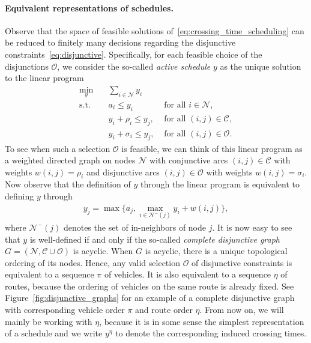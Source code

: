 \documentclass[a4paper]{article}
\theoremstyle{definition}
\theoremstyle{plain}
\begin{document}
\paragraph{Equivalent representations of schedules.}
Observe that the space of feasible solutions of~\eqref{eq:crossing_time_scheduling} can be reduced to finitely
many decisions regarding the disjunctive constraints~\eqref{eq:disjunctive}. Specifically, for each
feasible choice of the disjunctions $\mathcal{O}$, we consider the so-called
\textit{active schedule} $y$ as the unique solution to the linear program
\begin{subequations}
  \label{eq:active_schedule}
\begin{align}
  \min_{y} \quad & \sum_{i \in \mathcal{N}} y_{i} \\
  \text{s.t.} \quad & a_{i} \leq y_{i} & \text{ for all } i \in \mathcal{N}, \\
           & y_{i} + \rho_{i} \leq y_{j}, & \text{ for all } (i,j) \in \mathcal{C}, \\
           & y_{i} + \sigma_{i} \leq y_{j}, & \text{ for all } (i,j) \in \mathcal{O} .
\end{align}
\end{subequations}
To see when such a selection $\mathcal{O}$ is feasible, we can think of this
linear program as a weighted directed graph on nodes $\mathcal{N}$ with
conjunctive arcs $(i,j) \in \mathcal{C}$ with weights $w(i,j) = \rho_{i}$ and
disjunctive arcs $(i,j) \in \mathcal{O}$ with weights $w(i,j) = \sigma_{i}$. Now
observe that the definition of $y$ through the linear program is equivalent to
defining $y$ through
\begin{align}
  \label{eq:y_max}
  y_{j} = \max\{ a_{j}, \max_{i \in \mathcal{N}^{-}(j)} y_i + w(i,j) \} ,
\end{align}
where $\mathcal{N}^{-}(j)$ denotes the set of in-neighbors of node $j$. It is
now easy to see that $y$ is well-defined if and only if the so-called \textit{complete disjunctive graph}
$G=(\mathcal{N}, \mathcal{C} \cup \mathcal{O})$ is acyclic.
%
When $G$ is acyclic, there is a unique topological ordering of its nodes. Hence,
any valid selection $\mathcal{O}$ of disjunctive constraints is equivalent to a
sequence $\pi$ of vehicles. It is also equivalent to a sequence $\eta$ of routes,
because the ordering of vehicles on the same route is already fixed. See
Figure~\ref{fig:disjunctive_graphs} for an example of a complete disjunctive
graph with corresponding vehicle order $\pi$ and route order $\eta$.
%
From now on, we will mainly be working with $\eta$, because it is in some sense the
simplest representation of a schedule and we write $y^{\eta}$ to denote the
corresponding induced crossing times.
\end{document}
